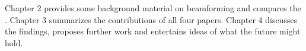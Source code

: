 Chapter 2 provides some background material on beamforming and compares the . Chapter 3 summarizes the contributions of all four papers. Chapter 4 discusses the findings, proposes further work and entertains ideas of what the future might hold.

%
%      
%   
%   
%
%
%   
%
%      
%
%
%    
%   
%   
%   
%   

